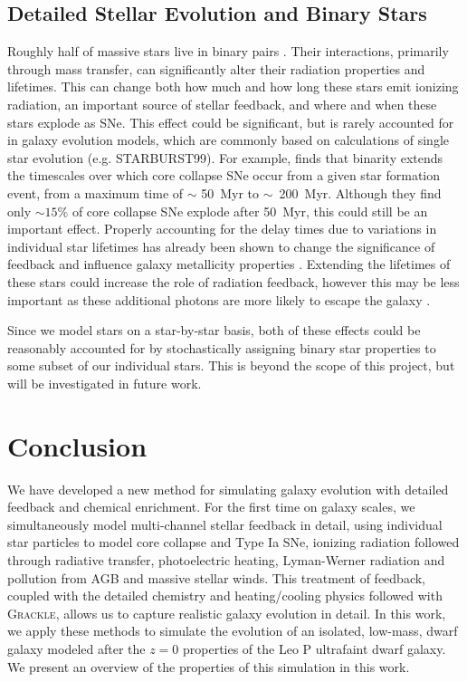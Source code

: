 \documentclass[twocolumn]{aastex61}
\begin{document}
\subsection{Detailed Stellar Evolution and Binary Stars}
\label{sec:binary stars} 

Roughly half of massive stars live in binary pairs \citep{Sana2013}. Their interactions, primarily through mass transfer, can significantly alter their radiation properties and lifetimes. This can change both how much and how long these stars emit ionizing radiation, an important source of stellar feedback, and where and when these stars explode as SNe. This effect could be significant, but is rarely accounted for in galaxy evolution models, which are commonly based on calculations of single star evolution (e.g. STARBURST99). For example, \citet{Zapartas2017} finds that binarity extends the timescales over which core collapse SNe occur from a given star formation event, from a maximum time of $\sim$ 50~Myr to $\sim$~200~Myr. Although they find only $\sim 15\%$ of core collapse SNe explode after 50~Myr, this could still be an important effect. Properly accounting for the delay times due to variations in individual star lifetimes has already been shown to change the significance of feedback and influence galaxy metallicity properties \citep{Kimm2015}. Extending the lifetimes of these stars could increase the role of radiation feedback, however this may be less important as these additional photons are more likely to escape the galaxy \citep[e.g.][]{Ma2016-binary}. 

Since we model stars on a star-by-star basis, both of these effects could be reasonably accounted for by stochastically assigning binary star properties to some subset of our individual stars. This is beyond the scope of this project, but will be investigated in future work.

\section{Conclusion}
\label{sec:conclusion}
We have developed a new method for simulating galaxy evolution with detailed feedback and chemical enrichment. For the first time on galaxy scales, we simultaneously model multi-channel stellar feedback in detail, using individual star particles to model core collapse and Type Ia SNe, ionizing radiation followed through radiative transfer, photoelectric heating, Lyman-Werner radiation and pollution from AGB and massive stellar winds. This treatment of feedback, coupled with the detailed chemistry and heating/cooling physics followed with \textsc{Grackle}, allows us to capture realistic galaxy evolution in detail. In this work, we apply these methods to simulate the evolution of an isolated, low-mass, dwarf galaxy modeled after the $z=0$ properties of the Leo P ultrafaint dwarf galaxy. We present an overview of the properties of this simulation 
in this work.
\end{document}
